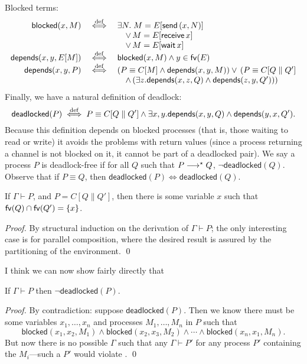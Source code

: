 \documentclass[orivec,envcountsame]{llncs}
\begin{document}
Blocked terms:
\newcommand{\blockedp}{\mathsf{blocked}}
\newcommand{\depp}{\mathsf{depends}}
\[\begin{array}{rcl}
  \blockedp(x,M) &\defiff& \exists N. \; M = E[\gvconst{send} \app (x,N)] \\
  && \quad \lor \, M = E[\gvconst{receive} \app x] \\
  && \quad \lor \, M = E[\gvconst{wait} \app x] \\
  \depp(x,y,E[M]) &\defiff& \blockedp(x,M) \land y \in \fv(E) \\
  \depp(x,y,P) &\defiff& (P \equiv C[M] \land \depp(x,y,M)) \lor \, (P \equiv C[Q \parallel Q'] \\
  && \quad \land \, (\exists z. \depp(x,z,Q) \land \depp(z,y,Q')))
\end{array}\]
Finally, we have a natural definition of deadlock:
\newcommand{\deadlockp}{\ensuremath{\mathsf{deadlocked}}}
\[
\deadlockp(P) \defiff P \equiv C[Q \parallel Q'] \land \exists x,y. \depp(x,y,Q) \land \depp(y,x,Q').
\]
Because this definition depends on blocked processes (that is, those waiting to read or write) it
avoids the problems with return values (since a process returning a channel is not blocked on it, it
cannot be part of a deadlocked pair).  We say a process $P$ is deadlock-free if for all $Q$ such
that $P \longrightarrow^\star Q$, $\lnot\deadlockp(Q)$.  Observe that if $P \equiv Q$, then $\deadlockp(P)
\iff \deadlockp(Q)$.

\begin{lemma}\label{thm:procs-share-one-channel}
  If $\Gamma \vdash P$, and $P = C[Q \parallel Q']$, then there is some variable $x$ such that
  $\mathsf{fv}(Q) \cap \mathsf{fv}(Q') = \{ x \}$.
\end{lemma}

\begin{proof}
  By structural induction on the derivation of $\Gamma \vdash P$; the only interesting case is for
  parallel composition, where the desired result is assured by the partitioning of the
  environment. \qed
\end{proof}

I think we can now show fairly directly that

\begin{lemma}\label{thm:typed-configs-df}
  If $\Gamma \vdash P$ then $\lnot \deadlockp(P)$.
\end{lemma}

\begin{proof}
  By contradiction: suppose $\deadlockp(P)$.  Then we know there must be some variables
  $x_1,\dots,x_n$ and processes $M_1,\dots,M_n$ in $P$ such that
  \[
    \blockedp(x_1,x_2,M_1) \land \blockedp(x_2,x_3,M_2) \land \cdots \land \blockedp(x_n,x_1,M_n).
  \]
  But now there is no possible $\Gamma$ such that any $\Gamma \vdash P'$ for any process $P'$
  containing the $M_i$---such a $P'$ would violate .  \qed
\end{proof}
\end{document}
